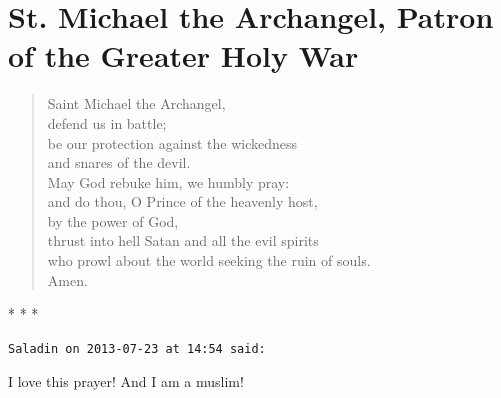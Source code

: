 \section{St. Michael the Archangel, Patron of the Greater Holy War}

\begin{quotex}
\begin{verse}
Saint Michael the Archangel,\\
defend us in battle;\\
be our protection against the wickedness\\
and snares of the devil.\\
May God rebuke him, we humbly pray:\\
and do thou, O Prince of the heavenly host,\\
by the power of God,\\
thrust into hell Satan and all the evil spirits\\
who prowl about the world seeking the ruin of souls.\\
Amen.
\end{verse}
\end{quotex}


\begin{center}* * *\end{center}

\begin{footnotesize}
\begin{sffamily}
\texttt{Saladin on 2013-07-23 at 14:54 said:}

I love this prayer! And I am a muslim!


\hfill

\end{sffamily}
\end{footnotesize}

